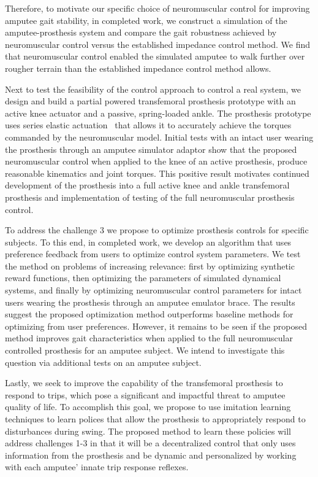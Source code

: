 Therefore, to motivate our specific choice of neuromuscular control for
improving amputee gait stability, in completed work, we construct a simulation
of the amputee-prosthesis system and compare the gait robustness achieved by
neuromuscular control versus the established impedance control method. We find
that neuromuscular control enabled the simulated amputee to walk further over
rougher terrain than the established impedance control method allows.

Next to test the feasibility of the control approach to control a real system, we
design and build a partial powered transfemoral prosthesis prototype with an
active knee actuator and a passive, spring-loaded ankle. The prosthesis
prototype uses series elastic actuation~\citep{pratt1995series} that allows it
to accurately achieve the torques commanded by the neuromuscular model. Initial
tests with an intact user wearing the prosthesis through an amputee simulator
adaptor show that the proposed neuromuscular control when applied to the knee of
an active prosthesis, produce reasonable kinematics and joint torques. This
positive result motivates continued development of the prosthesis into a
full active knee and ankle transfemoral prosthesis and implementation of testing
of the full neuromuscular prosthesis control.

To address the challenge 3 we propose to optimize prosthesis controls for
specific subjects. To this end, in completed work, we develop an algorithm that
uses preference feedback from users to optimize control system parameters. We
test the method on problems of increasing relevance: first by optimizing
synthetic reward functions, then optimizing the parameters of simulated
dynamical systems, and finally by optimizing neuromuscular control parameters
for intact users wearing the prosthesis through an amputee emulator brace. The
results suggest the proposed optimization method outperforms baseline methods
for optimizing from user preferences. However, it remains to be seen if the
proposed method improves gait characteristics when applied to the full
neuromuscular controlled prosthesis for an amputee subject. We intend to
investigate this question via additional tests on an amputee subject.

Lastly, we seek to improve the capability of the transfemoral prosthesis to
respond to trips, which pose a significant and impactful threat to amputee
quality of life. To accomplish this goal, we propose to use imitation learning
techniques \citep{argall2009survey} to learn polices that allow the prosthesis
to appropriately respond to disturbances during swing.  The proposed method to
learn these policies will address challenges 1-3 in that it will be a
decentralized control that only uses information from the prosthesis and be
dynamic and personalized by working with each amputee' innate trip response
reflexes.

